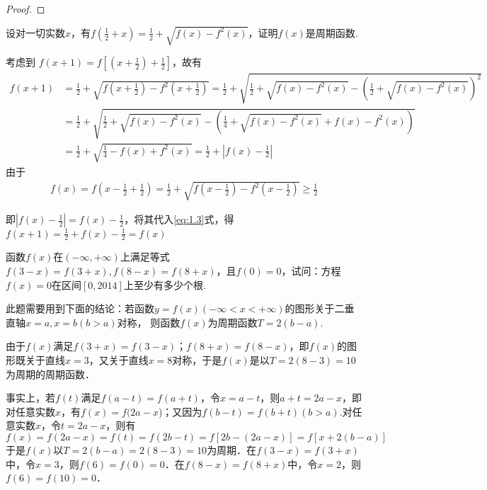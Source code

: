 \begin{xiti}
\begin{proof}
\end{proof}
\item 设对一切实数$x$，有$f \left( \frac { 1 } { 2 } + x \right) = \frac { 1 } { 2 } + \sqrt { f ( x ) - f ^ { 2 } ( x ) }$，证明$f(x)$是周期函数.
\begin{solution}
	考虑到 $f(x+1)=f[(x+\frac{1}{2})+\frac{1}{2}]$，故有
	\begin{equation}\label{eq:1.3}
	\begin{aligned}
	f(x+1)&=\frac{1}{2}+\sqrt{f(x+\frac{1}{2})-f^{2}(x+\frac{1}{2} )}=\frac{1}{2}+\sqrt{\frac{1}{2}+\sqrt{f\left(x\right)-f^2\left(x\right)}-\left(\frac{1}{2}+\sqrt{f\left(x\right)-f^2\left(x\right)}\right)^2}\\
	&=\frac{1}{2}+\sqrt{\frac{1}{2}+\sqrt{f\left(x\right)-f^2\left(x\right)}-\left(\frac{1}{4}+\sqrt{f\left(x\right)-f^2\left(x\right)}+f\left(x\right)-f^2\left(x\right)\right)}\\
	&=\frac{1}{2}+\sqrt{\frac{1}{4}-f\left(x\right)+f^2\left(x\right)}=\frac{1}{2}+\left|f(x)-\frac{1}{2}\right|
	\end{aligned}
	\end{equation}
	由于
	\begin{equation}
	\begin{aligned}
	f(x)=f(x-\frac{1}{2}+\frac{1}{2})=\frac{1}{2}+\sqrt{f(x-\frac{1}{2})-f^{2}(x-\frac{1}{2})} \geqslant \frac{1}{2}
	\end{aligned}
	\end{equation}
	
	即$\left|f(x)-\frac{1}{2}\right|=f(x)-\frac{1}{2}$，将其代入\ref{eq:1.3}式，得
	$f(x+1)=\frac{1}{2}+f(x)-\frac{1}{2}=f(x)$
\end{solution}
\item 函数$f(x)$在$(-\infty,+\infty)$上满足等式$f ( 3 - x ) = f ( 3 + x ) , f ( 8 - x ) = f ( 8 + x )$，且$f(0)=0$，试问：方程$f(x)=0$在区间$[0,2014]$上至少有多少个根.

\begin{solution}
	此题需要用到下面的结论：若函数$y=f(x) (-\infty <x<+\infty)$的图形关于二垂直轴$x=a,x=b(b>a)$对称，
	则函数$f(x)$为周期函数$T=2(b-a)$.
	
	由于$ f(x) $满足$ f(3+x)=f(3-x) $；$ f(8+x)=f(8-x)$，即$ f(x) $的图形既关于直线$ x=3 $，又关于直线$ x=8 $对称，于是$ f(x) $是以$ T=2(8-3)=10 $为周期的周期函数．
	
	事实上，若$ f(t) $满足$ f(a-t)=f(a+t) $，令$ x=a-t $，则$ a+t=2a-x $，即对任意实数$ x $，有$ f(x)=f(2a-x $)；又因为$ f(b-t)=f(b+t)(b>a) $.对任意实数$x$，令$ t=2a-x $，则有
\[ f(x)=f(2a-x)=f(t)=f(2b-t)=f[2b-(2a-x)]=f[x+2(b-a)] \]
	于是$ f(x) $以$ T=2(b-a)=2(8-3)=10 $为周期．在$ f(3-x)=f(3+x) $中，令$ x=3 $，则$ f(6)=f(0)=0 $．在$ f(8-x)=f(8+x) $中，令$ x=2 $，则$ f(6)=f(10)=0 $．
	

\end{solution}
\end{xiti}
